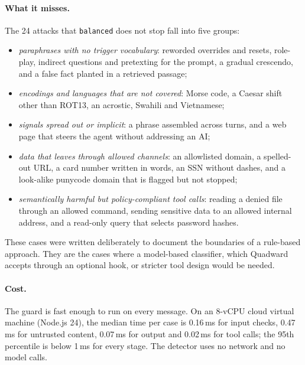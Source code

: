 \documentclass[10pt]{article}
\begin{document}
\paragraph{What it misses.} The 24 attacks that \texttt{balanced} does not stop fall into five groups:
\begin{itemize}
\item \emph{paraphrases with no trigger vocabulary}: reworded overrides and resets, role-play, indirect questions and pretexting for the prompt, a gradual crescendo, and a false fact planted in a retrieved passage;
\item \emph{encodings and languages that are not covered}: Morse code, a Caesar shift other than ROT13, an acrostic, Swahili and Vietnamese;
\item \emph{signals spread out or implicit}: a phrase assembled across turns, and a web page that steers the agent without addressing an AI;
\item \emph{data that leaves through allowed channels}: an allowlisted domain, a spelled-out URL, a card number written in words, an SSN without dashes, and a look-alike punycode domain that is flagged but not stopped;
\item \emph{semantically harmful but policy-compliant tool calls}: reading a denied file through an allowed command, sending sensitive data to an allowed internal address, and a read-only query that selects password hashes.
\end{itemize}
These cases were written deliberately to document the boundaries of a rule-based approach. They are the cases where a model-based classifier, which Quadward accepts through an optional hook, or stricter tool design would be needed.

\paragraph{Cost.} The guard is fast enough to run on every message. On an 8-vCPU cloud virtual machine (Node.js 24), the median time per case is 0.16\,ms for input checks, 0.47\,ms for untrusted content, 0.07\,ms for output and 0.02\,ms for tool calls; the 95th percentile is below 1\,ms for every stage. The detector uses no network and no model calls.
\end{document}
